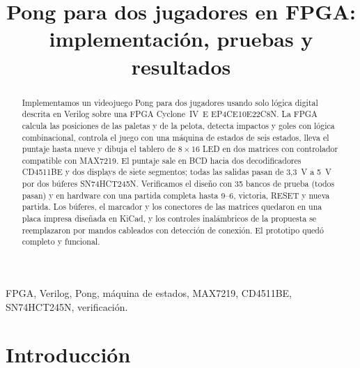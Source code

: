 \documentclass[conference,a4paper]{IEEEtran}
\begin{document}
\title{Pong para dos jugadores en FPGA: implementación, pruebas y resultados}

\author{
}

\maketitle

\begin{abstract}
Implementamos un videojuego Pong para dos jugadores usando solo lógica digital descrita en Verilog sobre una FPGA Cyclone~IV~E EP4CE10E22C8N. La FPGA calcula las posiciones de las paletas y de la pelota, detecta impactos y goles con lógica combinacional, controla el juego con una máquina de estados de seis estados, lleva el puntaje hasta nueve y dibuja el tablero de $8\times16$ LED en dos matrices con controlador compatible con MAX7219. El puntaje sale en BCD hacia dos decodificadores CD4511BE y dos displays de siete segmentos; todas las salidas pasan de 3,3~V a 5~V por dos búferes SN74HCT245N. Verificamos el diseño con 35 bancos de prueba (todos pasan) y en hardware con una partida completa hasta 9--6, victoria, RESET y nueva partida. Los búferes, el marcador y los conectores de las matrices quedaron en una placa impresa diseñada en KiCad, y los controles inalámbricos de la propuesta se reemplazaron por mandos cableados con detección de conexión. El prototipo quedó completo y funcional.
\end{abstract}

\begin{IEEEkeywords}
FPGA, Verilog, Pong, máquina de estados, MAX7219, CD4511BE, SN74HCT245N, verificación.
\end{IEEEkeywords}

\section{Introducción}
\end{document}
